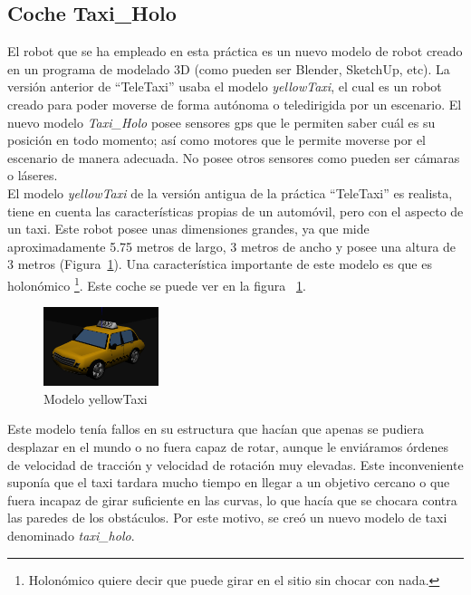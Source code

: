 \subsection{Coche Taxi\_Holo}
El robot que se ha empleado en esta práctica es un nuevo modelo de robot creado en un programa de modelado 3D (como pueden ser Blender, SketchUp, etc). La versión anterior de ``TeleTaxi'' usaba el modelo \textit{yellowTaxi}, el cual es un robot creado para poder moverse de forma autónoma o teledirigida por un escenario. El nuevo modelo \textit{Taxi\_Holo} posee sensores \acrshort{gps} que le permiten saber cuál es su posición en todo momento; así como motores que le permite moverse por el escenario de manera adecuada. No posee otros sensores como pueden ser cámaras o láseres.\\

El modelo \textit{yellowTaxi} de la versión antigua de la práctica ``TeleTaxi'' es realista, tiene en cuenta las características propias de un automóvil, pero con el aspecto de un taxi. Este robot posee unas dimensiones grandes, ya que mide aproximadamente 5.75 metros de largo, 3 metros de ancho y posee una altura de 3 metros (Figura~\ref{fig.teleTaxi}).  Una característica importante de este modelo es que es  holonómico \footnote{Holonómico quiere decir que puede girar en el sitio sin chocar con nada.}. Este coche  se puede ver en la figura ~\ref{fig.teleTaxi}.

\begin{figure}[H]
  \begin{center}
    \includegraphics[width=0.3\textwidth]{figures/GPP/gpp_teleTaxi.png}
		\caption{Modelo yellowTaxi}
		\label{fig.teleTaxi}
		\end{center}
\end{figure}

Este modelo tenía fallos en su estructura que hacían que apenas se pudiera desplazar en el mundo o no fuera capaz de rotar, aunque le enviáramos órdenes de velocidad de tracción y velocidad de rotación muy elevadas. Este inconveniente suponía que el taxi tardara mucho tiempo en llegar a un objetivo cercano o que fuera incapaz de girar suficiente en las curvas, lo que hacía que se chocara contra las paredes de los obstáculos. Por este motivo, se creó un nuevo modelo de taxi denominado \textit{taxi\_holo}.\\

